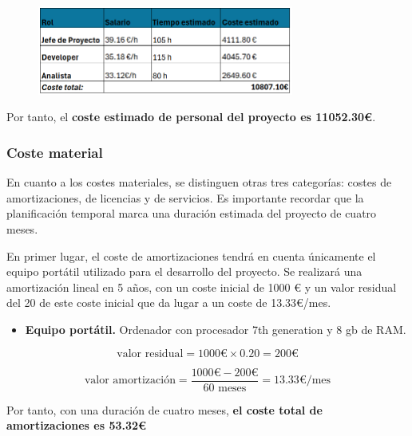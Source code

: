 \begin{figure}[H]
    \centering
    \includegraphics[width=0.75\textwidth]{tables/costeEstimcap.png}
    \label{table:costeEstimcap}
\end{figure}

Por tanto, el \textbf{coste estimado de personal del proyecto es 11052.30€}.

%


\subsubsection{Coste material}

En cuanto a los costes materiales, se distinguen otras tres categorías: costes de amortizaciones, de licencias y de servicios. Es importante recordar que la planificación temporal marca una duración estimada del proyecto de cuatro meses.

En primer lugar, el coste de amortizaciones tendrá en cuenta únicamente el equipo portátil utilizado para el desarrollo del proyecto. Se realizará una amortización lineal en 5 años, con un coste inicial de 1000 € y un valor residual del 20 de este coste inicial que da lugar a un coste de 13.33€/mes.

\begin{itemize}
    \item \textbf{Equipo portátil.} Ordenador con procesador 7th generation y 8 gb de RAM.
\end{itemize}

\begin{equation}
    \text{valor residual} = 1000 \text{€} \times 0.20 = 200 \text{€}
\end{equation}

\begin{equation}
    \text{valor amortización} = \frac{1000 \text{€} - 200 \text{€}}{60 \text{ meses}} = 13.33 \text{€/mes}
\end{equation}

Por tanto, con una duración de cuatro meses, \textbf{el coste total de amortizaciones es 53.32€}

